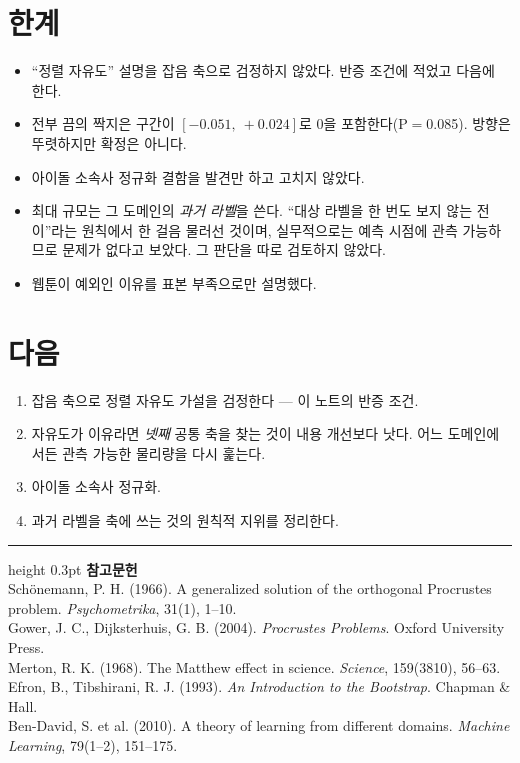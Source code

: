 \documentclass[10pt]{article}
\begin{document}
\section{한계}

\begin{itemize}[leftmargin=1.1em,itemsep=0.15em]
\item ``정렬 자유도'' 설명을 잡음 축으로 검정하지 않았다. 반증 조건에 적었고
      다음에 한다.
\item 전부 끔의 짝지은 구간이 $[-0.051,\ +0.024]$로 0을 포함한다(P$=$0.085).
      방향은 뚜렷하지만 확정은 아니다.
\item 아이돌 소속사 정규화 결함을 발견만 하고 고치지 않았다.
\item 최대 규모는 그 도메인의 \emph{과거 라벨}을 쓴다. ``대상 라벨을 한 번도
      보지 않는 전이''라는 원칙에서 한 걸음 물러선 것이며, 실무적으로는 예측
      시점에 관측 가능하므로 문제가 없다고 보았다. 그 판단을 따로 검토하지 않았다.
\item 웹툰이 예외인 이유를 표본 부족으로만 설명했다.
\end{itemize}

\section{다음}

\begin{enumerate}[leftmargin=1.3em,itemsep=0.15em]
\item 잡음 축으로 정렬 자유도 가설을 검정한다 --- 이 노트의 반증 조건.
\item 자유도가 이유라면 \emph{넷째} 공통 축을 찾는 것이 내용 개선보다 낫다.
      어느 도메인에서든 관측 가능한 물리량을 다시 훑는다.
\item 아이돌 소속사 정규화.
\item 과거 라벨을 축에 쓰는 것의 원칙적 지위를 정리한다.
\end{enumerate}

\vspace{0.6em}
\hrule height 0.3pt
\vspace{0.5em}
{\footnotesize
\textbf{참고문헌}\\[0.3em]
Schönemann, P. H. (1966). A generalized solution of the orthogonal Procrustes
problem. \emph{Psychometrika}, 31(1), 1--10.\\[0.15em]
Gower, J. C., Dijksterhuis, G. B. (2004). \emph{Procrustes Problems}.
Oxford University Press.\\[0.15em]
Merton, R. K. (1968). The Matthew effect in science. \emph{Science},
159(3810), 56--63.\\[0.15em]
Efron, B., Tibshirani, R. J. (1993). \emph{An Introduction to the Bootstrap}.
Chapman \& Hall.\\[0.15em]
Ben-David, S. et al. (2010). A theory of learning from different domains.
\emph{Machine Learning}, 79(1--2), 151--175.
}
\end{document}
